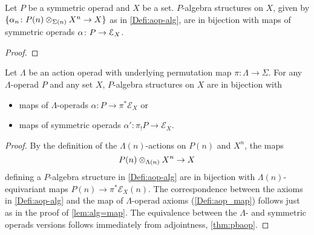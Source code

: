 
\begin{lem}\label{lem:alg=map}
Let $P$ be a symmetric operad and $X$ be a set. $P$-algebra structures on $X$, given by $\{ \alpha_n \colon  P(n) \otimes_{\Sigma(n)} X^{n} \rightarrow X\}$ as in \cref{Defi:aop-alg}, are in bijection with maps of symmetric operads $\alpha \colon P \to \mathcal{E}_X$.
\end{lem}
\begin{proof}
\end{proof}

\begin{cor}\label{cor:pi-star}
Let $\Lambda$ be an action operad with underlying permutation map $\pi \colon \Lambda \to \Sigma$. 
 For any $\Lambda$-operad $P$ and any set $X$, $P$-algebra structures on $X$ are in bijection with 
\begin{itemize}
\item maps of $\Lambda$-operads $\alpha \colon P \to \pi^* \mathcal{E}_X$ or
\item maps of symmetric operads $\alpha' \colon \pi_{!}P \to  \mathcal{E}_X$.
\end{itemize}
\end{cor}
\begin{proof}
By the definition of the $\Lambda(n)$-actions on $P(n)$ and $X^n$, the maps \[P(n) \otimes_{\Lambda(n)} X^{n} \rightarrow X\] defining a $P$-algebra structure in \cref{Defi:aop-alg} are in bijection with 
$\Lambda(n)$-equivariant maps $P(n) \to \pi^*\mathcal{E}_X(n)$. The correspondence between the axioms in \cref{Defi:aop-alg} and the map of $\Lambda$-operad axioms (\cref{Defi:aop_map}) follows just as in the proof of \cref{lem:alg=map}. The equivalence between the $\Lambda$- and symmetric operads versions follows immediately from adjointness, \cref{thm:pbaop}.
\end{proof}

